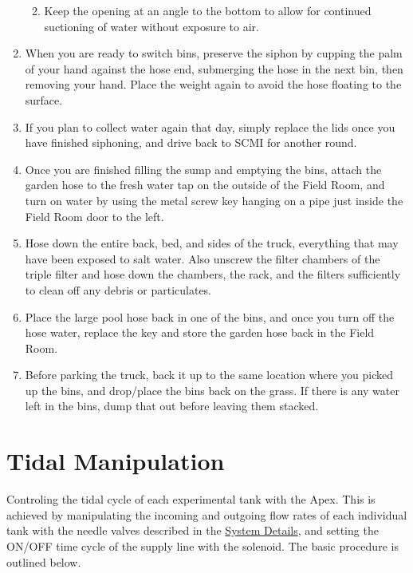 \documentclass[
]{book}
\providecommand{\tightlist}{%
  \setlength{\itemsep}{0pt}\setlength{\parskip}{0pt}}
\begin{document}
\begin{enumerate}
  \begin{enumerate}
  \def\labelenumii{\arabic{enumii}.}
  \tightlist
  \item
    Keep the opening at an angle to the bottom to allow for continued suctioning of water without exposure to air.
  \end{enumerate}
\item
  When you are ready to switch bins, preserve the siphon by cupping the palm of your hand against the hose end, submerging the hose in the next bin, then removing your hand. Place the weight again to avoid the hose floating to the surface.
\item
  If you plan to collect water again that day, simply replace the lids once you have finished siphoning, and drive back to SCMI for another round.
\item
  Once you are finished filling the sump and emptying the bins, attach the garden hose to the fresh water tap on the outside of the Field Room, and turn on water by using the metal screw key hanging on a pipe just inside the Field Room door to the left.
\item
  Hose down the entire back, bed, and sides of the truck, everything that may have been exposed to salt water. Also unscrew the filter chambers of the triple filter and hose down the chambers, the rack, and the filters sufficiently to clean off any debris or particulates.
\item
  Place the large pool hose back in one of the bins, and once you turn off the hose water, replace the key and store the garden hose back in the Field Room.
\item
  Before parking the truck, back it up to the same location where you picked up the bins, and drop/place the bins back on the grass. If there is any water left in the bins, dump that out before leaving them stacked.
\end{enumerate}

\hypertarget{tidal-manipulation}{%
\chapter{Tidal Manipulation}\label{tidal-manipulation}}

Controling the tidal cycle of each experimental tank with the Apex. This is achieved by manipulating the incoming and outgoing flow rates of each individual tank with the needle valves described in the \protect\hyperlink{system-details}{System Details}, and setting the ON/OFF time cycle of the supply line with the solenoid. The basic procedure is outlined below.
\end{document}
